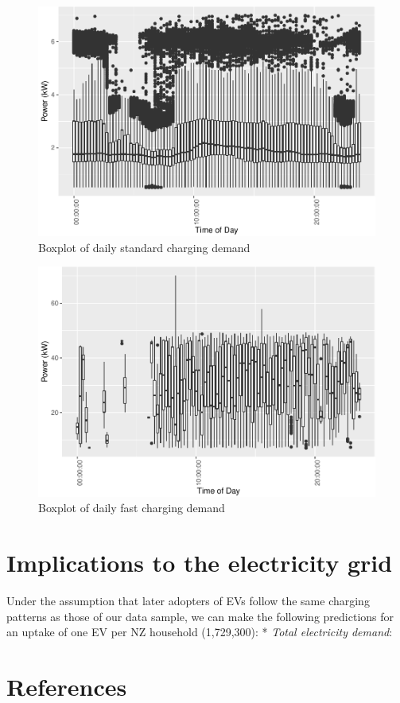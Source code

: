 \documentclass[]{article}
\begin{document}
\begin{figure}
\centering
\includegraphics{EVBB_report_files/figure-latex/boxplotCharging-1.pdf}
\caption{\label{fig:boxplotCharging}Boxplot of daily standard charging
demand}
\end{figure}

\begin{figure}
\centering
\includegraphics{EVBB_report_files/figure-latex/plot3-1.pdf}
\caption{\label{fig:plot3}Boxplot of daily fast charging demand}
\end{figure}

\section{Implications to the electricity
grid}\label{implications-to-the-electricity-grid}

Under the assumption that later adopters of EVs follow the same charging
patterns as those of our data sample, we can make the following
predictions for an uptake of one EV per NZ household (1,729,300): *
\emph{Total electricity demand}:

\section{References}\label{references}
\end{document}

